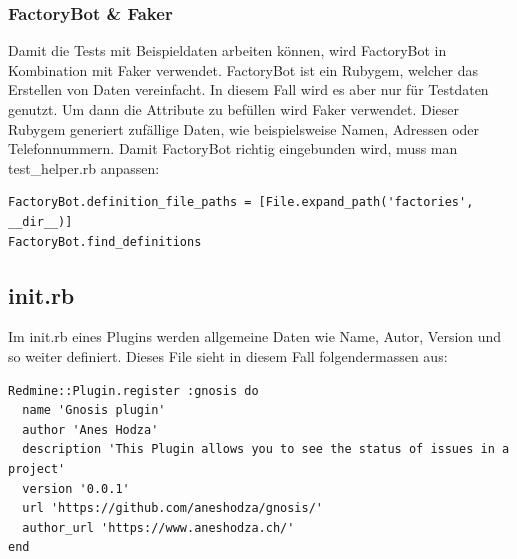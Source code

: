\subsubsection{FactoryBot \& Faker}
Damit die Tests mit Beispieldaten arbeiten können, wird FactoryBot in Kombination mit Faker verwendet. FactoryBot ist ein
Rubygem, welcher das Erstellen von Daten vereinfacht. In diesem Fall wird es aber nur für Testdaten genutzt. Um dann die
Attribute zu befüllen wird Faker verwendet. Dieser Rubygem generiert zufällige Daten, wie beispielsweise Namen, Adressen
oder Telefonnummern. \newline
Damit FactoryBot richtig eingebunden wird, muss man test\_helper.rb anpassen:
\begin{codebox}[]
  \begin{verbatim}
FactoryBot.definition_file_paths = [File.expand_path('factories', __dir__)]
FactoryBot.find_definitions
  \end{verbatim}
\end{codebox}

\subsection{init.rb}
Im init.rb eines Plugins werden allgemeine Daten wie Name, Autor, Version und so weiter definiert. Dieses File sieht
in diesem Fall folgendermassen aus:
\begin{codebox}[]
  \begin{verbatim}
Redmine::Plugin.register :gnosis do
  name 'Gnosis plugin'
  author 'Anes Hodza'
  description 'This Plugin allows you to see the status of issues in a project'
  version '0.0.1'
  url 'https://github.com/aneshodza/gnosis/'
  author_url 'https://www.aneshodza.ch/'
end
  \end{verbatim}
\end{codebox}

